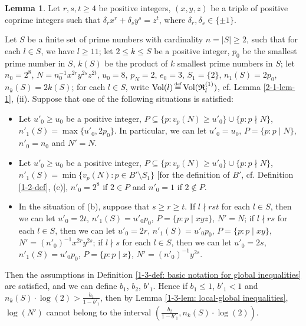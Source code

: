 \documentclass[a4paper, 12pt]{article}
\DeclareMathOperator{\defeq}{\overset{\text{\tiny{def}}}{=}}
\DeclareMathOperator{\Vol}{\text{Vol}}
\numberwithin{equation}{section}
\theoremstyle{definition}
\newtheorem{lem}[thm]{Lemma}
\begin{document}
\begin{lem}  \label{2-1-lem-2}
Let $r,s,t \ge 4$ be positive integers, $(x,y,z)$ be a triple of positive coprime integers such that $\delta_r x^r + \delta_s y^s =  z^t$, where $\delta_r,\delta_s \in \{\pm 1\}$.

Let $S$ be a finite set of prime numbers with cardinality $n = |S| \ge 2$, such that for each $l\in S$, we have $l \ge 11$;
let $2\le k\le S$ be a positive integer, $p_0$ be the smallest prime number in $S$, $k(S)$ be the product of $k$ smallest prime numbers in $S$;
let $n_0 = 2^8$, $N = n_0^{-1}x^{2r}y^{2s}z^{2t}$, $u_0 = 8$, $p_N = 2$, $e_0 = 3$,  $S_1 = \{2\}$, $n_1(S) = 2 p_0$, $n_k(S) = 2 k(S)$;
for each $l\in S$, write $\Vol(l) \defeq \Vol(\mathfrak R_l^{(1)})$, cf. Lemma \ref{2-1-lem-1}, (ii).
Suppose that one of the following situations is satisfied:

\begin{itemize}
\item [(a)] Let $u'_0 \ge u_0$ be a positive integer, $P\subseteq \{p: v_p(N) \ge u'_0 \} \cup \{p: p\nmid N\}$, $n'_1(S) = \max\{u'_0, 2p_0\}$.
In particular, we can let $u'_0 = u_0$, $P = \{p: p\mid N\}$, $n'_0 = n_0$ and $N' = N$.

\item [(b)] Let $u'_0 \ge u_0$ be a positive integer, $P\subseteq \{p: v_p(N) \ge u'_0 \} \cup \{p: p\nmid N\}$, $n'_1(S) = \min\{v_p(N): p\in B'\setminus S_1\}$ [for the definition of $B'$, cf. Definition \ref{1-2-def}, (e)], $n'_0 = 2^8$ if $2\in P$ and $n'_0 = 1$ if $2\notin P$.

\item [(c)] In the situation of (b), suppose that $s\ge r\ge t$. 
If $l\nmid rst$ for each $l\in S$, then we can let $u'_0 = 2t$, $n'_1(S) = u'_0 p_0$, $P=\{p: p\mid xyz\}$, $N' = N$;
if $l\nmid rs$ for each $l\in S$, then we can let $u'_0 = 2r$, $n'_1(S) = u'_0 p_0$, $P=\{p: p\mid xy\}$, $N' = (n'_0)^{-1} x^{2r} y^{2s}$;
if $l\nmid s$ for each $l\in S$, then we can let $u'_0 = 2s$, $n'_1(S) = u'_0 p_0$, $P=\{p: p\mid x\}$, $N' = (n'_0)^{-1} y^{2s}$.

\end{itemize}

Then the assumptions in Definition \ref{1-3-def: basic notation for global inequalities} are satisfied, and we can define $b_1$, $b_2$, $b'_1$. 
Hence if $b_1 \le  1$, $b'_1 < 1$ and $n_k(S)\cdot \log(2) > \frac{b_2}{1-b'_1}$, then by Lemma \ref{1-3-lem: local-global inequalities}, $\log(N')$ cannot belong to the interval $(\frac{b_2}{1-b'_1}, n_k(S)\cdot \log(2) ) .$

\end{lem}
\end{document}

